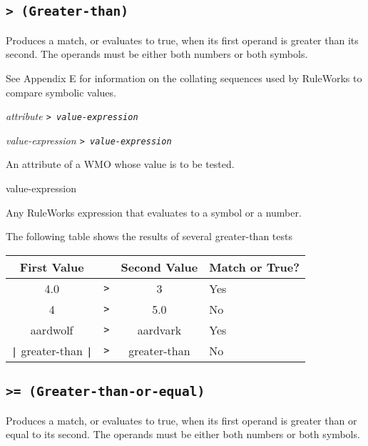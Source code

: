 \subsection{\tt> (Greater-than)}

Produces a match, or evaluates to true, when its first operand is
greater than its second. The operands must be either both numbers or
both symbols.

See Appendix E for information on the collating sequences used by
RuleWorks to compare symbolic values.

\Format

\ct\it{attribute} \tt> \it{value-expression}

\it{value-expression} \tt> \it{value-expression}

\begin{operands}
\item[\ct{attribute}]

  An attribute of a WMO whose value is to be tested.

\item[value-expression]

  Any RuleWorks expression that evaluates to a symbol or a number.
\end{operands}

\Example

The following table shows the results of several greater-than tests

\begin{tabularx}{\columnwidth}{cccX}
  \toprule
  First Value      &   & Second Value & Match or True? \\
  \midrule
  4.0              & \verb|>| & 3            & Yes            \\
  4                & \verb|>| & 5.0          & No             \\
  aardwolf         & \verb|>| & aardvark     & Yes            \\
  \verb,|, greater-than \verb,|, & \verb|>| & greater-than & No             \\
  \bottomrule
\end{tabularx}

\subsection{\tt{>=} (Greater-than-or-equal)}

Produces a match, or evaluates to true, when its first operand is
greater than or equal to its second. The operands must be either both
numbers or both symbols.

